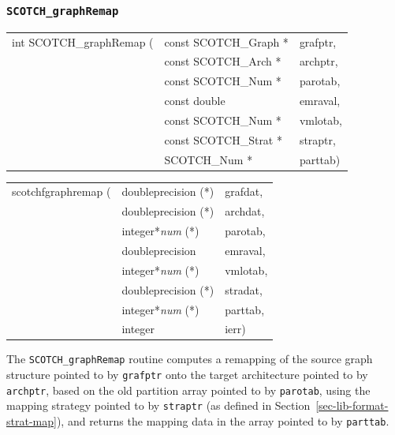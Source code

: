 \subsubsection{{\tt SCOTCH\_graphRemap}}

\begin{itemize}
\progsyn

{\tt\begin{tabular}{l@{}ll}
int SCOTCH\_graphRemap ( & const SCOTCH\_Graph * & grafptr, \\
                         & const SCOTCH\_Arch *  & archptr, \\
                         & const SCOTCH\_Num *   & parotab, \\
                         & const double          & emraval, \\
                         & const SCOTCH\_Num *   & vmlotab, \\
                         & const SCOTCH\_Strat * & straptr, \\
                         & SCOTCH\_Num *         & parttab)
\end{tabular}}

{\tt\begin{tabular}{l@{}ll}
scotchfgraphremap ( & doubleprecision (*)   & grafdat, \\
                    & doubleprecision (*)   & archdat, \\
                    & integer*{\it num} (*) & parotab, \\
                    & doubleprecision       & emraval, \\
                    & integer*{\it num} (*) & vmlotab, \\
                    & doubleprecision (*)   & stradat, \\
                    & integer*{\it num} (*) & parttab, \\
                    & integer               & ierr)
\end{tabular}}

\progdes

The {\tt SCOTCH\_graphRemap} routine computes a remapping of the
source graph structure pointed to by {\tt grafptr} onto the target
architecture pointed to by {\tt archptr}, based on the old partition
array pointed to by {\tt parotab}, using the mapping strategy pointed
to by {\tt straptr} (as defined in Section~\ref{sec-lib-format-strat-map}),
and returns the mapping data in the array pointed to by {\tt parttab}.


\end{itemize}
